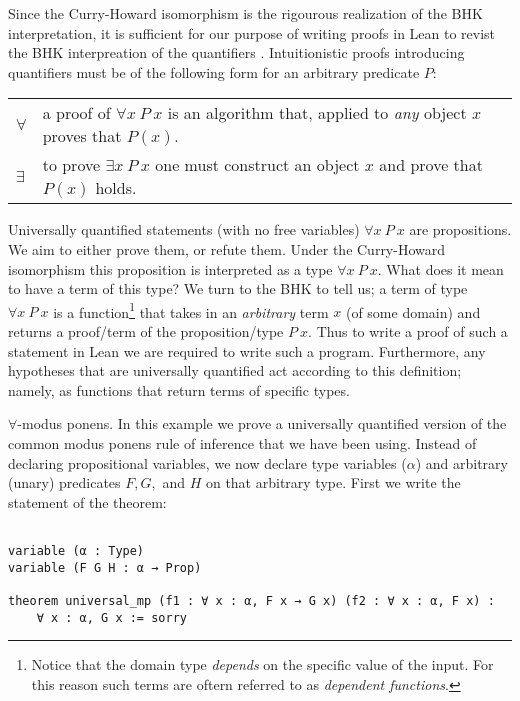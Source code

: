\documentclass{book}
\begin{document}
    Since the Curry-Howard isomorphism is the rigourous realization of the BHK interpretation, it is sufficient for our purpose of writing proofs in Lean to revist the BHK interpreation of the quantifiers \cite{sep-mathematics-constructive}. Intuitionistic proofs introducing quantifiers must be of the following form for an arbitrary predicate $P$: 
	
	\vspace{0.2cm}
	
	\begin{center}
		\begin{tabular}{p{1.5cm}p{8cm}}
		$\forall$ & a proof of $\forall x \ P \ x$ is an algorithm that, applied to \emph{any} object $x$ proves that $P(x)$.\\
		$\exists$ & to prove $\exists x \ P \ x$ one must construct an object $x$ and prove that $P(x)$ holds. 
		\end{tabular}
	\end{center}
    
    Universally quantified statements (with no free variables) $\forall x \ P \ x$ are propositions. We aim to either prove them, or refute them. Under the Curry-Howard isomorphism this proposition is interpreted as a type $\forall x \ P \ x$. What does it mean to have a term of this type? We turn to the BHK to tell us; a term of type $\forall x \ P \ x$ is a function\footnote{Notice that the domain type \emph{depends} on the specific value of the input. For this reason such terms are oftern referred to as \emph{dependent functions}.} that takes in an \emph{arbitrary} term $x$ (of some domain) and returns a proof/term of the proposition/type $P \ x$. Thus to write a proof of such a statement in Lean we are required to write such a program. Furthermore, any hypotheses that are universally quantified act according to this definition; namely, as functions that return terms of specific types. 


$\forall$-modus ponens. In this example we prove a universally quantified version of the common modus ponens rule of inference that we have been using. Instead of declaring propositional variables, we now declare type variables ($\alpha$) and arbitrary (unary) predicates $F, G,$ and $H$ on that arbitrary type. First we write the statement of the theorem: 

\begin{center}
\begin{lstlisting}
    
variable (α : Type)
variable (F G H : α → Prop)

theorem universal_mp (f1 : ∀ x : α, F x → G x) (f2 : ∀ x : α, F x) :
    ∀ x : α, G x := sorry

\end{lstlisting}            
\end{center}
\end{document}
